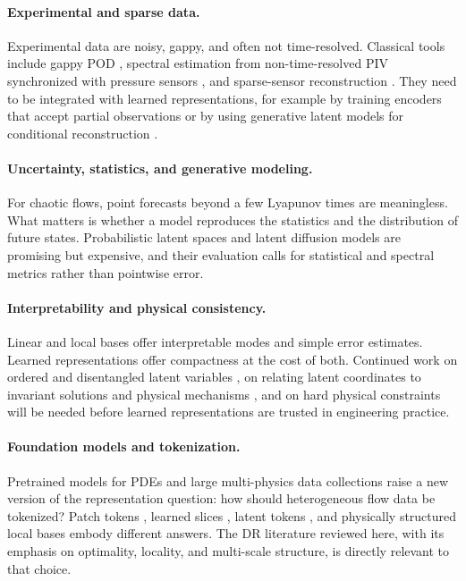 \paragraph{Experimental and sparse data.}
Experimental data are noisy, gappy, and often not time-resolved. Classical
tools include gappy POD \parencite{everson1995gappy}, spectral estimation from
non-time-resolved PIV synchronized with pressure sensors
\parencite{zhang2020samm}, and sparse-sensor reconstruction
\parencite{manohar2018sensor,callaham2019robust,erichson2020shallow}. They need to
be integrated with learned representations, for example by training encoders
that accept partial observations or by using generative latent models for
conditional reconstruction \parencite{du2024cnf}.

\paragraph{Uncertainty, statistics, and generative modeling.}
For chaotic flows, point forecasts beyond a few Lyapunov times are
meaningless. What matters is whether a model reproduces the statistics and the
distribution of future states. Probabilistic latent spaces and latent
diffusion models \parencite{kohl2023acdm,gao2024bayesian,du2024cnf} are promising
but expensive, and their evaluation calls for statistical and spectral metrics
rather than pointwise error.

\paragraph{Interpretability and physical consistency.}
Linear and local bases offer interpretable modes and simple error estimates.
Learned representations offer compactness at the cost of both. Continued work
on ordered and disentangled latent variables
\parencite{fukami2020hierarchical,eivazi2022betavae}, on relating latent
coordinates to invariant solutions and physical mechanisms
\parencite{page2021revealing,farzamnik2023snapshots}, and on hard physical
constraints \parencite{lee2021deepconservation,mohan2020embedding} will be needed
before learned representations are trusted in engineering practice.

\paragraph{Foundation models and tokenization.}
Pretrained models for PDEs \parencite{mccabe2024mpp,herde2024poseidon} and large
multi-physics data collections \parencite{ohana2024well} raise a new version of
the representation question: how should heterogeneous flow data be tokenized?
Patch tokens \parencite{dosovitskiy2021vit}, learned slices
\parencite{wu2024transolver}, latent tokens \parencite{alkin2024upt}, and
physically structured local bases \parencite{deshmukh2020dls} embody different
answers. The DR literature reviewed here, with its emphasis on optimality,
locality, and multi-scale structure, is directly relevant to that choice.

